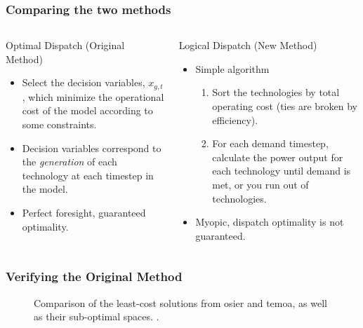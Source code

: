 \begin{frame}
    \frametitle{Comparing the two methods}

    \begin{columns}
        
        \column[t]{5cm}

        \begin{block}{Optimal Dispatch (Original Method)}
            \begin{itemize}[<+->]
                \item Select the decision variables, $x_{g,t}$, which minimize
                the operational cost of the model according to some constraints.
                \item Decision variables correspond to the \textit{generation}
                of each technology at each timestep in the model.
                \item Perfect foresight, guaranteed optimality.
            \end{itemize}
        \end{block}
        \column[t]{5cm}
        \begin{block}{Logical Dispatch (New Method)}
            \begin{itemize}[<+->]
                \item Simple algorithm
            \begin{enumerate}
                \item Sort the technologies by total operating cost (ties are
                broken by efficiency).
                \item For each demand timestep, calculate the power output for
                each technology until demand is met, or you run out of
                technologies.
            \end{enumerate}
            \item Myopic, dispatch optimality is not guaranteed.
            \end{itemize}
        \end{block}
    \end{columns}

\end{frame}


\begin{frame}
    \frametitle{Verifying the Original Method}

    \begin{figure}
        \centering
        \resizebox{0.75\columnwidth}{!}{}
        \caption{Comparison of the least-cost solutions from \gls{osier} and
        \gls{temoa}, as well as their sub-optimal spaces.
        .}
        \label{fig:osier-temoa-benchmark}
    \end{figure}
\end{frame}

